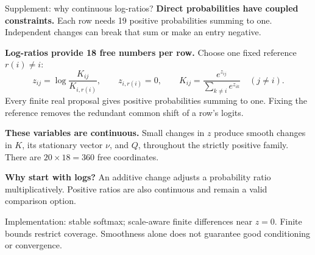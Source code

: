 \documentclass[aspectratio=169,11pt]{beamer}
\newcommand{\src}[1]{{\scriptsize\color{Muted}#1\par}}
\begin{document}
\begingroup
{}
\begin{frame}{Supplement: why continuous log-ratios?}
\small
\textbf{Direct probabilities have coupled constraints.} Each row needs 19 positive probabilities
summing to one. Independent changes can break that sum or make an entry negative.

\textbf{Log-ratios provide 18 free numbers per row.} Choose one fixed reference $r(i)\ne i$:
\[
 z_{ij}=\log\frac{K_{ij}}{K_{i,r(i)}},\qquad z_{i,r(i)}=0,
 \qquad K_{ij}=\frac{e^{z_{ij}}}{\sum_{k\ne i}e^{z_{ik}}}\quad(j\ne i).
\]
Every finite real proposal gives positive probabilities summing to one.
Fixing the reference removes the redundant common shift of a row's logits.

\textbf{These variables are continuous.} Small changes in $z$ produce smooth changes in $K$,
its stationary vector $\nu$, and $Q$, throughout the strictly positive family.
There are $20\times18=360$ free coordinates.

\textbf{Why start with logs?} An additive change adjusts a probability ratio multiplicatively.
Positive ratios are also continuous and remain a valid comparison option.

\vfill
\src{Implementation: stable softmax; scale-aware finite differences near $z=0$.
Finite bounds restrict coverage. Smoothness alone does not guarantee good conditioning or convergence.}
\end{frame}
\endgroup
\end{document}
